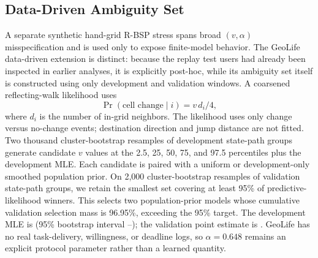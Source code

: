 \documentclass[10pt,journal,compsoc]{IEEEtran}
\begin{document}
\subsection{Data-Driven Ambiguity Set}
A separate synthetic hand-grid R-BSP stress spans broad \((v,\alpha)\) misspecification and is used only to expose finite-model behavior. The GeoLife data-driven extension is distinct: because the replay test users had already been inspected in earlier analyses, it is explicitly post-hoc, while its ambiguity set itself is constructed using only development and validation windows. A coarsened reflecting-walk likelihood uses
\[
 \Pr(\text{cell change}\mid i)=v\,d_i/4,
\]
where \(d_i\) is the number of in-grid neighbors. The likelihood uses only change versus no-change events; destination direction and jump distance are not fitted. Two thousand cluster-bootstrap resamples of development state-path groups generate candidate \(v\) values at the 2.5, 25, 50, 75, and 97.5 percentiles plus the development MLE. Each candidate is paired with a uniform or development-only smoothed population prior. On 2,000 cluster-bootstrap resamples of validation state-path groups, we retain the smallest set covering at least 95\% of predictive-likelihood winners. This selects two population-prior models whose cumulative validation selection mass is 96.95\%, exceeding the 95\% target. The development MLE is \GeoDevMLE{} (95\% bootstrap interval \GeoDevCILow{}--\GeoDevCIHigh{}); the validation point estimate is \GeoValMLE{}. GeoLife has no real task-delivery, willingness, or deadline logs, so \(\alpha=0.648\) remains an explicit protocol parameter rather than a learned quantity.
\end{document}
